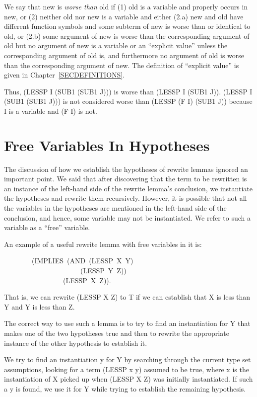 \documentclass[11pt]{book}
\newenvironment{pubasis}{\begin{flushleft}\ttfamily\small}{\normalsize\rmfamily\end{flushleft}}
\newcommand{\pubinlineunderline}[1]{\emph{#1}}
\newcommand{\pubdefaulttextsize}{\large}
\begin{document}
We say that new is \pubinlineunderline{worse than} old if (1) old is a variable
and properly occurs in new, or (2) neither old nor new is
a variable and either (2.a) new and old have different
function symbols and some subterm of new is worse than
or identical to old, or (2.b) some argument of new is worse than
the corresponding argument of old but no argument of
new is a variable or an ``explicit value'' unless
the corresponding argument of old is, and furthermore
no argument of old is worse than the corresponding argument of new.
The definition of ``explicit value'' is given in 
Chapter~\ref{SECDEFINITIONS}.

Thus, (LESSP I (SUB1 (SUB1 J))) is worse than (LESSP I (SUB1 J)).
(LESSP I (SUB1 (SUB1 J))) is not considered worse than (LESSP (F I) (SUB1 J)) because
I is a variable and (F I) is not.
\section{Free Variables In Hypotheses}
\pubdefaulttextsize
The discussion of how we establish the hypotheses of rewrite lemmas
ignored an important point.   We said that   after discovering
that the
term to be rewritten is an instance of  the left-hand side of the rewrite lemma's
conclusion,  we instantiate the hypotheses
and rewrite them recursively.  However, it is possible that not all the
variables in the hypotheses are mentioned in the left-hand side
of the conclusion, and hence, some variable may not be instantiated.
We refer to such a variable as a ``free'' variable.

An example of a useful rewrite lemma with free variables in it is:
\begin{pubasis}
~~~~~~~~(IMPLIES~(AND~(LESSP~X~Y)\\
~~~~~~~~~~~~~~~~~~~~~~(LESSP~Y~Z))\\
~~~~~~~~~~~~~~~~~(LESSP~X~Z)).\\
\end{pubasis}
That is, we can rewrite (LESSP X Z) to T if we can establish that
X is less than Y and Y is less than Z.

The correct way to use such a lemma is to try to find
an instantiation for Y that makes one of the two hypotheses true and then
to rewrite the appropriate instance
of the other hypothesis to establish it.

We try to find an instantiation y for  Y by searching
through the current type set assumptions, looking for a term
(LESSP x y) assumed to be true, where x is the instantiation of X picked up
when (LESSP X Z) was initially instantiated.
If such a y is found, we use it for Y while trying to establish the
remaining hypothesis.
\end{document}
